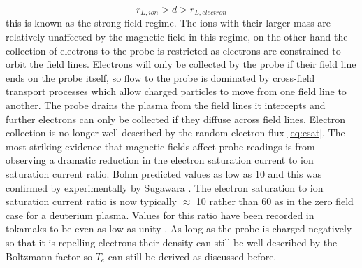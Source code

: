 \documentclass[12pt]{article}
\def\be{\begin{equation}}
\def\ee{\end{equation}}
\begin{document}
\be
r_{L,ion} > d >  r_{L, electron}
\ee
this is known as the strong field regime. The ions with their larger mass are relatively unaffected by the magnetic field in this regime, on the other hand the collection of electrons to the probe is restricted as electrons are constrained to orbit the field lines. Electrons will only be collected by the probe if their field line ends on the probe itself, so flow to the probe is dominated by cross-field transport processes which allow charged particles to move from one field line to another. The probe drains the plasma from the field lines it intercepts and further electrons can only be collected if they diffuse across field lines. Electron collection is no longer well described by the random electron flux \eqref{eq:esat}. The most striking  evidence that magnetic fields affect probe readings is from observing a dramatic reduction in the electron saturation current to ion saturation current ratio. Bohm predicted values as low as 10 \cite{discharges} and this was confirmed by experimentally by Sugawara \cite{monk}. The electron saturation to ion saturation current ratio is now  typically $\approx$ 10 rather than 60 as in the zero field case for a deuterium plasma.  Values for this ratio have been recorded in tokamaks to be even as low as unity \cite{matthews}.  As long as the probe is charged negatively so that it is repelling electrons their density can still be well described by the Boltzmann factor so $T_e$ can still be derived as discussed before. 
\end{document}
